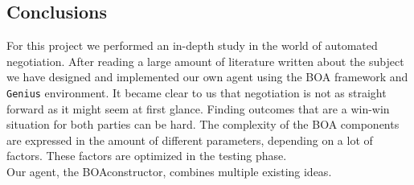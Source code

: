 \subsection{Conclusions}

For this project we performed an in-depth study in the world of automated negotiation. After reading a large amount of literature written about the subject we have designed and implemented our own agent using the BOA framework and \texttt{Genius} environment. It became clear to us that negotiation is not as straight forward as it might seem at first glance. Finding outcomes that are a win-win situation for both parties can be hard. The complexity of the BOA components are expressed in the amount of different parameters, depending on a lot of factors. These factors are optimized in the testing phase.  \\

Our agent, the BOAconstructor, combines multiple existing ideas.


